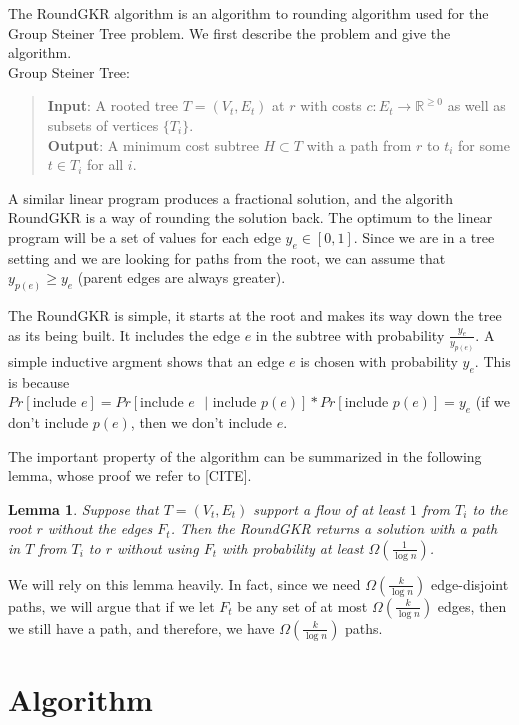 \documentclass[12pt]{article}
\newtheorem{lemma}{Lemma}
\begin{document}
The RoundGKR algorithm is an algorithm to rounding algorithm used for the Group Steiner Tree problem. We first describe the problem and give the algorithm. \\

Group Steiner Tree:
\begin{quote}
\textbf{Input}: A rooted tree $T = (V_t, E_t)$ at $r$ with costs $c: E_t \rightarrow \mathbb{R}^{\geq 0}$ as well as subsets of vertices $\{ T_i \}$. \\
\textbf{Output}: A minimum cost subtree $H \subset T$ with a path from $r$ to $t_i$ for some $t \in T_i$ for all $i$.
\end{quote}

A similar linear program produces a fractional solution, and the algorith RoundGKR is a way of rounding the solution back. The optimum to the linear program will be a set of values for each edge $y_e \in [0, 1]$. Since we are in a tree setting and we are looking for paths from the root, we can assume that $y_{p(e)} \geq y_e$ (parent edges are always greater).

The RoundGKR is simple, it starts at the root and makes its way down the tree as its being built. It includes the edge $e$ in the subtree with probability $\frac{y_e}{y_{p(e)}}$. A simple inductive argment shows that an edge $e$ is chosen with probability $y_e$. This is because $Pr[\text{include $e$}] = Pr[\text{include $e$ $|$ include $p(e)$}]*Pr[\text{include $p(e)$}] = y_e$ (if we don't include $p(e)$, then we don't include $e$. 

The important property of the algorithm can be summarized in the following lemma, whose proof we refer to [CITE].

\begin{lemma}
\label{lem:findpath}
Suppose that $T = (V_t, E_t)$ support a flow of at least $1$ from $T_i$ to the root $r$ without the edges $F_t$. Then the RoundGKR returns a solution with a path in $T$ from $T_i$ to $r$ without using $F_t$ with probability at least $\Omega(\frac{1}{\log n})$. 
\end{lemma}

We will rely on this lemma heavily. In fact, since we need $\Omega(\frac{k}{\log n})$ edge-disjoint paths, we will argue that if we let $F_t$ be any set of at most $\Omega(\frac{k}{\log n})$ edges, then we still have a path, and therefore, we have $\Omega(\frac{k}{\log n})$ paths.  

\section{Algorithm}
\end{document}
